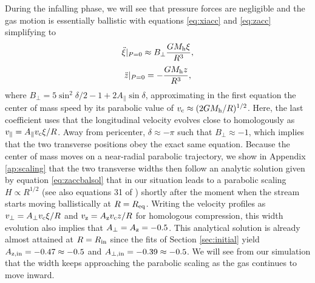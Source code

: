 \documentclass[a4paper,fleqn,usenatbib]{mnras}
\newcommand{\be}{\begin{equation}}
\newcommand{\ee}{\end{equation}}
\newcommand{\mh}{M_{\rm h}}
\begin{document}
During the infalling phase, we will see that pressure forces are negligible and the gas motion is essentially ballistic with equations \eqref{eq:xiacc} and \eqref{eq:zacc} simplifying to 
\be
\ddot{\xi}|_{P=0} \approx B_{\perp} \frac{G \mh \xi}{R^3},
\label{eq:xiacc_bal}
\ee
\be
\ddot{z}|_{P=0} = -\frac{G \mh z}{R^3},
\label{eq:zacc_bal}
\ee
where $B_{\perp} = 5 \sin^2 \delta /2 -1 + 2 A_{\parallel} \sin \delta$, approximating in the first equation the center of mass speed by its parabolic value of $v_{\rm c} \approx (2G \mh /R)^{1/2}$. Here, the last coefficient uses that the longitudinal velocity evolves close to homologously as $v_{\parallel} = A_{\parallel} v_{\rm c} \xi / R$. Away from pericenter, $\delta \approx -\pi$ such that $B_{\perp} \approx -1$, which implies that the two transverse positions obey the exact same equation. Because the center of mass moves on a near-radial parabolic trajectory, we show in Appendix \ref{ap:scaling} that the two transverse widths then follow an analytic solution given by equation \eqref{eq:zaccbalsol} that in our situation leads to a parabolic scaling $H \propto R^{1/2}$ (see also equations 31 of \citet{sari2010}) shortly after the moment when the stream starts moving ballistically at $R = R_{\rm eq}$. Writing the velocity profiles as $v_{\perp} = A_{\perp} v_{\rm c} \xi / R$ and $v_{\rm z} = A_{\rm z} v_{\rm c} z / R$ for homologous compression, this width evolution also implies that $A_{\perp} = A_{\rm z} = -0.5$. This analytical solution is already almost attained at $R = R_{\rm in}$ since the fits of Section \ref{sec:initial} yield $A_{\rm z,in}=-0.47 \approx -0.5$ and $A_{\rm \perp,in}= -0.39 \approx -0.5$. We will see from our simulation that the width keeps approaching the parabolic scaling as the gas continues to move inward.
\end{document}
